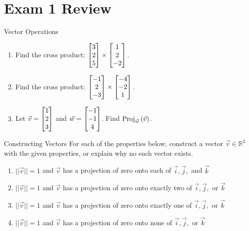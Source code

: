 \section*{Exam 1 Review}
\setcounter{counter}{0}
\begin{revex}{Vector Operations}
\begin{enumerate}
\item Find the cross product: $\begin{bmatrix}3\\2\\5\end{bmatrix}\times\begin{bmatrix}1\\2\\-2\end{bmatrix}.$
\vspace{1em}
\item Find the cross product: $\begin{bmatrix}-1\\2\\-3\end{bmatrix}\times \begin{bmatrix}-4\\-2\\1\end{bmatrix}. $
\vspace{1em}
\item Let $\vec{v}=\begin{bmatrix}1\\2\\3\end{bmatrix} $ and $\vec{w}=\begin{bmatrix}-1\\-1\\4\\\end{bmatrix}$. Find $\mathrm{Proj}_{\vec{w}}\left({\vec{v}}\right)$.
\end{enumerate}
\end{revex}

\begin{revex}{Constructing Vectors}
For each of the properties below, construct a vector $\vec{v}\in\mathbb{R}^3$ with the given properties, or explain why no such vector exists.

\begin{enumerate}
    \item $|| \vec{v} || = 1 $ and $\vec{v}$ has a projection of zero onto each of $\vec{i}, \vec{j},$ and $\vec{k}$
    \vspace{1em}
        \item $|| \vec{v} || = 1 $ and $\vec{v}$ has a projection of zero onto exactly two of $\vec{i}, \vec{j},$ or $\vec{k}$
    \vspace{1em}
    \item $|| \vec{v} || = 1 $ and $\vec{v}$ has a projection of zero onto exactly one of $\vec{i}, \vec{j},$ or $\vec{k}$
    \vspace{1em}
    \item $|| \vec{v} || = 1 $ and $\vec{v}$ has a projection of zero onto none of $\vec{i}, \vec{j},$ or $\vec{k}$
    
\end{enumerate}
\end{revex}


